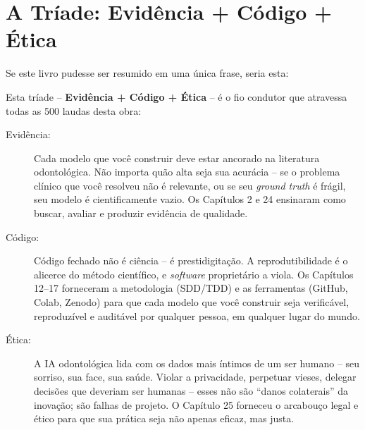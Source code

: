\section{A Tríade: Evidência + Código + Ética}
\label{sec:triade}

\nivelcinco

Se este livro pudesse ser resumido em uma única frase, seria esta:


Esta tríade -- \textbf{Evidência + Código + Ética} -- é o fio condutor que
atravessa todas as 500 laudas desta obra:

\begin{description}
  \item[Evidência:] Cada modelo que você construir deve estar ancorado na
    literatura odontológica. Não importa quão alta seja sua acurácia -- se o
    problema clínico que você resolveu não é relevante, ou se seu \textit{
    ground truth} é frágil, seu modelo é cientificamente vazio. Os Capítulos 2
    e 24 ensinaram como buscar, avaliar e produzir evidência de qualidade.

  \item[Código:] Código fechado não é ciência -- é prestidigitação. A
    reprodutibilidade é o alicerce do método científico, e \textit{software}
    proprietário a viola. Os Capítulos 12--17 forneceram a metodologia (SDD/TDD)
    e as ferramentas (GitHub, Colab, Zenodo) para que cada modelo que você
    construir seja verificável, reproduzível e auditável por qualquer pessoa,
    em qualquer lugar do mundo.

  \item[Ética:] A IA odontológica lida com os dados mais íntimos de um ser
    humano -- seu sorriso, sua face, sua saúde. Violar a privacidade, perpetuar
    vieses, delegar decisões que deveriam ser humanas -- esses não são ``danos
    colaterais'' da inovação; são falhas de projeto. O Capítulo 25 forneceu o
    arcabouço legal e ético para que sua prática seja não apenas eficaz, mas
    justa.
\end{description}


